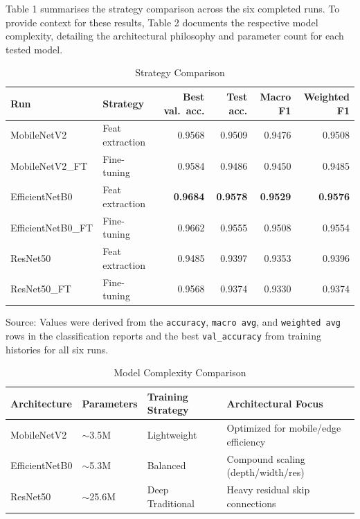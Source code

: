 \documentclass[12pt, a4paper]{article}
\begin{document}
Table 1 summarises the strategy comparison across the six completed runs. To provide context for these results, Table 2 documents the respective model complexity, detailing the architectural philosophy and parameter count for each tested model.

\begin{table}[htbp]
  \centering
  \caption{Strategy Comparison}
  \begin{tabular}{llrrrr}
    \toprule
    Run & Strategy & Best val.\ acc. & Test acc. & Macro F1 & Weighted F1 \\
    \midrule
    MobileNetV2             & Feat extraction & 0.9568 & 0.9509 & 0.9476 & 0.9508 \\
    MobileNetV2\_FT         & Fine-tuning        & 0.9584 & 0.9486 & 0.9450 & 0.9485 \\
    EfficientNetB0          & Feat extraction & \textbf{0.9684} & \textbf{0.9578} & \textbf{0.9529} & \textbf{0.9576} \\
    EfficientNetB0\_FT      & Fine-tuning       & 0.9662 & 0.9555 & 0.9508 & 0.9554 \\
    ResNet50                & Feat extraction & 0.9485 & 0.9397 & 0.9353 & 0.9396 \\
    ResNet50\_FT            & Fine-tuning        & 0.9568 & 0.9374 & 0.9330 & 0.9374 \\
    \bottomrule
  \end{tabular}
\end{table}

{\small\noindent Source: Values were derived from the \texttt{accuracy}, \texttt{macro avg}, and \texttt{weighted avg} rows in the classification reports and the best \texttt{val\_accuracy} from training histories for all six runs.}

\begin{table}[htbp]
  \centering
  \caption{Model Complexity Comparison}
  \begin{tabular}{llll}
    \toprule
    Architecture & Parameters & Training Strategy & Architectural Focus \\
    \midrule
    MobileNetV2    & ${\sim}$3.5M  & Lightweight      & Optimized for mobile/edge efficiency \\
    EfficientNetB0 & ${\sim}$5.3M  & Balanced         & Compound scaling (depth/width/res)   \\
    ResNet50       & ${\sim}$25.6M & Deep Traditional & Heavy residual skip connections      \\
    \bottomrule
  \end{tabular}
\end{table}
\end{document}
